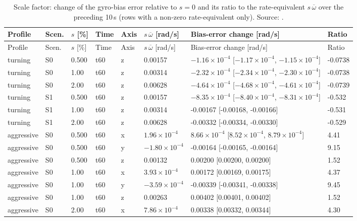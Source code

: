 {\scriptsize
\begin{longtable}{llllllll}
\caption{Scale factor: change of the gyro-bias error relative to $s = 0$ and its ratio to the rate-equivalent $s\,\overline{\omega}$ over the preceding 10\,s (rows with a non-zero rate-equivalent only). Source: .}\label{tab:es_sf_bias}\\
\toprule
Profile & Scen. & $s$ [\%] & Time & Axis & $s\,\overline{\omega}$ [rad/s] & Bias-error change [rad/s] & Ratio \\
\midrule
\endfirsthead
\toprule
Profile & Scen. & $s$ [\%] & Time & Axis & $s\,\overline{\omega}$ [rad/s] & Bias-error change [rad/s] & Ratio \\
\midrule
\endhead
turning & S0 & 0.500 & t60 & z & 0.00157 & $-1.16\times10^{-4}$ [$-1.17\times10^{-4}$, $-1.15\times10^{-4}$] & -0.0738 \\
turning & S0 & 1.00 & t60 & z & 0.00314 & $-2.32\times10^{-4}$ [$-2.34\times10^{-4}$, $-2.30\times10^{-4}$] & -0.0738 \\
turning & S0 & 2.00 & t60 & z & 0.00628 & $-4.64\times10^{-4}$ [$-4.68\times10^{-4}$, $-4.61\times10^{-4}$] & -0.0739 \\
turning & S1 & 0.500 & t60 & z & 0.00157 & $-8.35\times10^{-4}$ [$-8.40\times10^{-4}$, $-8.31\times10^{-4}$] & -0.532 \\
turning & S1 & 1.00 & t60 & z & 0.00314 & -0.00167 [-0.00168, -0.00166] & -0.531 \\
turning & S1 & 2.00 & t60 & z & 0.00628 & -0.00332 [-0.00334, -0.00330] & -0.529 \\
aggressive & S0 & 0.500 & t60 & x & $1.96\times10^{-4}$ & $8.66\times10^{-4}$ [$8.52\times10^{-4}$, $8.79\times10^{-4}$] & 4.41 \\
aggressive & S0 & 0.500 & t60 & y & $-1.80\times10^{-4}$ & -0.00164 [-0.00165, -0.00164] & 9.15 \\
aggressive & S0 & 0.500 & t60 & z & 0.00132 & 0.00200 [0.00200, 0.00200] & 1.52 \\
aggressive & S0 & 1.00 & t60 & x & $3.93\times10^{-4}$ & 0.00172 [0.00169, 0.00175] & 4.37 \\
aggressive & S0 & 1.00 & t60 & y & $-3.59\times10^{-4}$ & -0.00339 [-0.00341, -0.00338] & 9.45 \\
aggressive & S0 & 1.00 & t60 & z & 0.00263 & 0.00402 [0.00401, 0.00402] & 1.52 \\
aggressive & S0 & 2.00 & t60 & x & $7.86\times10^{-4}$ & 0.00338 [0.00332, 0.00344] & 4.30 \\

\end{longtable}}
